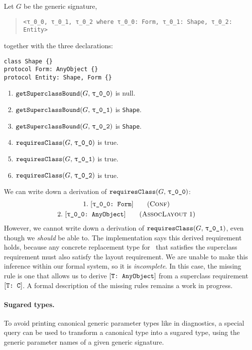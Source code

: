 \documentclass[../generics]{subfiles}
\begin{document}
\begin{example}
Let $G$ be the generic signature,
\begin{quote}
\begin{verbatim}
<τ_0_0, τ_0_1, τ_0_2 where τ_0_0: Form, τ_0_1: Shape, τ_0_2: Entity>
\end{verbatim}
\end{quote}
together with the three declarations:
\begin{Verbatim}
class Shape {}
protocol Form: AnyObject {}
protocol Entity: Shape, Form {}
\end{Verbatim}

\begin{enumerate}
\item $\Query{getSuperclassBound}{G,\,\texttt{\rT}}$ is null.
\item $\Query{getSuperclassBound}{G,\,\texttt{\rU}}$ is \texttt{Shape}.
\item $\Query{getSuperclassBound}{G,\,\texttt{\rV}}$ is \texttt{Shape}.
\item $\Query{requiresClass}{G,\,\texttt{\rT}}$ is true.
\item $\Query{requiresClass}{G,\,\texttt{\rU}}$ is true.
\item $\Query{requiresClass}{G,\,\texttt{\rV}}$ is true.
\end{enumerate}
We can write down a derivation of $\Query{requiresClass}{G,\,\texttt{\rT}}$:
\begin{gather*}
\ConfStep{\rT}{Form}{1}\\
\AssocLayoutStep{1}{\rT}{2}
\end{gather*}
However, we cannot write down a derivation of $\Query{requiresClass}{G,\,\texttt{\rU}}$, even though we \emph{should} be able to. The implementation says this derived requirement holds, because any concrete replacement type for \rU\ that satisfies the superclass requirement must also satisfy the layout requirement. We are unable to make this inference within our formal system, so it is \emph{incomplete}. In this case, the missing rule is one that allows us to derive $[\texttt{T:~AnyObject}]$ from a superclass requirement $[\texttt{T:~C}]$. A formal description of the missing rules remains a work in progress.
\end{example}

\paragraph{Sugared types.} To avoid printing canonical generic parameter types like  in diagnostics, a special query can be used to transform a canonical type into a sugared type, using the generic parameter names of a given generic signature.
\end{document}
